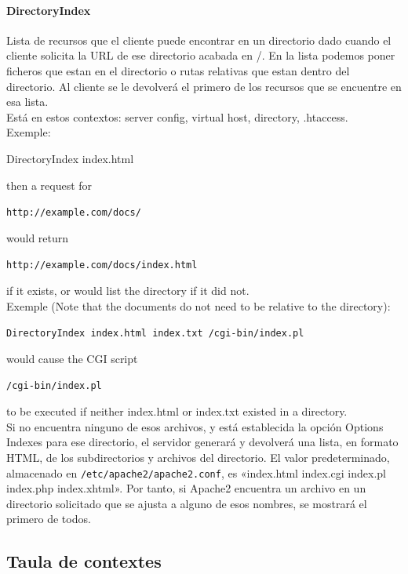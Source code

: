 \documentclass[a4paper, 11pt]{article}
\begin{document}
\paragraph{DirectoryIndex}

Lista de recursos que el cliente puede encontrar en un directorio dado cuando el cliente solicita la URL de ese directorio acabada en \slash. En la lista podemos poner ficheros que estan en el directorio o rutas relativas que estan dentro del directorio. Al cliente se le devolverá el primero de los recursos que se encuentre en esa lista.\\
Está en estos contextos: server config, virtual host, directory, .htaccess.\\
Exemple: 

	DirectoryIndex index.html 

then a request for 

\verb+http://example.com/docs/+ 

would return 

\verb+http://example.com/docs/index.html+ 

if it exists, or would list the directory if it did not.\\
Exemple (Note that the documents do not need to be relative to the directory):

	\verb+DirectoryIndex index.html index.txt /cgi-bin/index.pl+

would cause the CGI script 

\verb+/cgi-bin/index.pl+ 

to be executed if neither index.html or index.txt existed in a directory.\\
Si no encuentra ninguno de esos archivos, y está establecida la opción Options Indexes para ese directorio, el servidor generará y devolverá una lista, en formato HTML, de los subdirectorios y archivos del directorio. El valor predeterminado, almacenado en \verb+/etc/apache2/apache2.conf+, es «index.html index.cgi index.pl index.php index.xhtml». Por tanto, si Apache2 encuentra un archivo en un directorio solicitado que se ajusta a alguno de esos nombres, se mostrará el primero de todos. 

\subsection{Taula de contextes}
\end{document}
